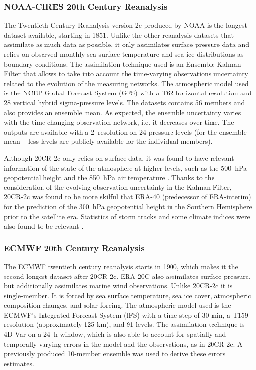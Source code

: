 \documentclass{ametsoc}
\begin{document}
\subsubsection{NOAA-CIRES 20th Century Reanalysis}

The Twentieth Century Reanalysis version 2c \citep[20CR-2c, ][]{Compo2011} produced by NOAA is the longest dataset available, starting in 1851. Unlike the other reanalysis datasets that assimilate as much data as possible, it only assimilates surface pressure data and relies on observed monthly sea-surface temperature and sea-ice distributions as boundary conditions. The assimilation technique used is an Ensemble Kalman Filter that allows to take into account the time-varying observations uncertainty related to the evolution of the measuring networks. The atmospheric model used is the NCEP Global Forecast System (GFS) with a T62 horizontal resolution and 28 vertical hybrid sigma-pressure levels. The datasets contains 56 members and also provides an ensemble mean. As expected, the ensemble uncertainty varies with the time-changing observation network, i.e. it decreases over time. The outputs are available with a 2\degree\ resolution on 24 pressure levels (for the ensemble mean -- less levels are publicly available for the individual members).

Although 20CR-2c only relies on surface data, it was found to have relevant information of the state of the atmosphere at higher levels, such as the 500~hPa geopotential height and the 850~hPa air temperature \citep{Compo2011}. Thanks to the consideration of the evolving observation uncertainty in the Kalman Filter, 20CR-2c was found to be more skilful that ERA-40 (predecessor of ERA-interim) for the prediction of the 300~hPa geopotential height in the Southern Hemisphere prior to the satellite era. Statistics of storm tracks and some climate indices were also found to be relevant \citep{Compo2011}.


\subsubsection{ECMWF 20th Century Reanalysis}

The ECMWF twentieth century reanalysis \citep[ERA-20C, ][]{Poli2016} starts in 1900, which makes it the second longest dataset after 20CR-2c. ERA-20C also assimilates surface pressure, but additionally assimilates marine wind observations. Unlike 20CR-2c it is single-member. It is forced by sea surface temperature, sea ice cover, atmospheric composition changes, and solar forcing. The atmospheric model used is the ECMWF’s Integrated Forecast System (IFS) with a time step of 30 min, a T159 resolution (approximately 125 km), and 91 levels. The assimilation technique is 4D-Var on a 24~h window, which is also able to account for spatially and temporally varying errors in the model and the observations, as in 20CR-2c. A previously produced 10-member ensemble was used to derive these errors estimates.
\end{document}
